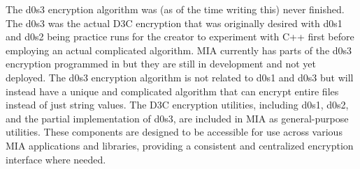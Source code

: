The d0s3 encryption algorithm was (as of the time writing this) never finished. The d0s3 was the actual D3C encryption that was originally desired with d0s1 and d0s2 being practice runs for the creator to experiment with C++ first before employing an actual complicated algorithm. MIA currently has parts of the d0s3 encryption programmed in but they are still in development and not yet deployed. The d0s3 encryption algorithm is not related to d0s1 and d0s3 but will instead have a unique and complicated algorithm that can encrypt entire files instead of just string values. The D3C encryption utilities, including d0s1, d0s2, and the partial implementation of d0s3, are included in MIA as general-purpose utilities. These components are designed to be accessible for use across various MIA applications and libraries, providing a consistent and centralized encryption interface where needed.




